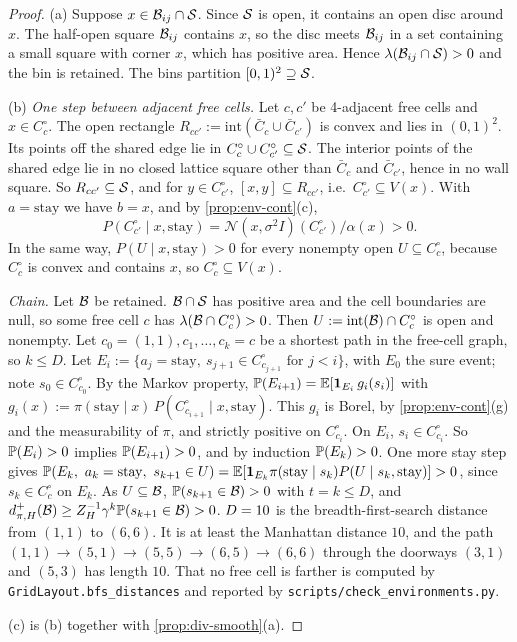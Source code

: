 \begin{proof}
(a) Suppose $x\in\cB_{ij}\cap\cS$. Since $\cS$ is open, it contains an open disc around $x$.
The half-open square $\cB_{ij}$ contains $x$, so the disc meets $\cB_{ij}$ in a set containing a small square with corner $x$, which has positive area. Hence $\Leb(\cB_{ij}\cap\cS)>0$ and the bin is retained.
The bins partition $[0,1)^2\supseteq\cS$.

(b) \emph{One step between adjacent free cells.}
Let $c,c'$ be 4-adjacent free cells and $x\in C^\circ_c$.
The open rectangle $R_{cc'}:=\mathrm{int}(\bar C_c\cup\bar C_{c'})$ is convex and lies in $(0,1)^2$.
Its points off the shared edge lie in $C^\circ_c\cup C^\circ_{c'}\subseteq\cS$.
The interior points of the shared edge lie in no closed lattice square other than $\bar C_c$ and $\bar C_{c'}$, hence in no wall square.
So $R_{cc'}\subseteq\cS$, and for $y\in C^\circ_{c'}$, $[x,y]\subseteq R_{cc'}$, i.e.\ $C^\circ_{c'}\subseteq V(x)$.
With $a=\mathrm{stay}$ we have $b=x$, and by \cref{prop:env-cont}(c),
\[
P(C^\circ_{c'}\mid x,\mathrm{stay})=\mathcal N(x,\sigma^2I)(C^\circ_{c'})/\alpha(x)>0 .
\]
In the same way, $P(U\mid x,\mathrm{stay})>0$ for every nonempty open $U\subseteq C^\circ_c$, because $C^\circ_c$ is convex and contains $x$, so $C^\circ_c\subseteq V(x)$.

\emph{Chain.} Let $\cB$ be retained. $\cB\cap\cS$ has positive area and the cell boundaries are null, so some free cell $c$ has $\Leb(\cB\cap C^\circ_c)>0$. Then $U:=\mathrm{int}(\cB)\cap C^\circ_c$ is open and nonempty.
Let $c_0=(1,1),c_1,\dots,c_k=c$ be a shortest path in the free-cell graph, so $k\le D$.
Let $E_i:=\{a_j=\mathrm{stay},\ s_{j+1}\in C^\circ_{c_{j+1}}\text{ for }j<i\}$, with $E_0$ the sure event; note $s_0\in C^\circ_{c_0}$.
By the Markov property, $\Prob(E_{i+1})=\E[\ind_{E_i}\,g_i(s_i)]$ with $g_i(x):=\pi(\mathrm{stay}\mid x)\,P(C^\circ_{c_{i+1}}\mid x,\mathrm{stay})$. This $g_i$ is Borel, by \cref{prop:env-cont}(g) and the measurability of $\pi$, and strictly positive on $C^\circ_{c_i}$.
On $E_i$, $s_i\in C^\circ_{c_i}$. So $\Prob(E_i)>0$ implies $\Prob(E_{i+1})>0$, and by induction $\Prob(E_k)>0$.
One more stay step gives $\Prob(E_k,\ a_k=\mathrm{stay},\ s_{k+1}\in U)=\E[\ind_{E_k}\pi(\mathrm{stay}\mid s_k)P(U\mid s_k,\mathrm{stay})]>0$, since $s_k\in C^\circ_c$ on $E_k$.
As $U\subseteq\cB$, $\Prob(s_{k+1}\in\cB)>0$ with $t=k\le D$, and $d^+_{\pi,H}(\cB)\ge Z_H^{-1}\gamma^k\Prob(s_{k+1}\in\cB)>0$.
$D=\vn{env.D}{10}$ is the breadth-first-search distance from $(1,1)$ to $(6,6)$. It is at least the Manhattan distance $10$, and the path $(1,1)\to(5,1)\to(5,5)\to(6,5)\to(6,6)$ through the doorways $(3,1)$ and $(5,3)$ has length $10$.
That no free cell is farther is computed by \texttt{GridLayout.bfs\_distances} and reported by \texttt{scripts/check\_environments.py}.

(c) is (b) together with \cref{prop:div-smooth}(a).
\end{proof}

